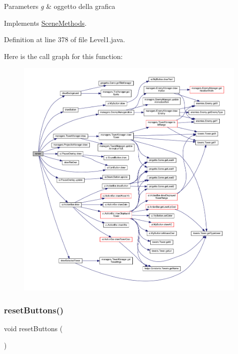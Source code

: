 \begin{DoxyParams}{Parameters}
{\em g} & oggetto della grafica \\
\hline
\end{DoxyParams}


Implements \hyperlink{interfacescenes_1_1_scene_methods_a203b6ad9d5e4d54dd1152986eec4dedc}{Scene\+Methods}.



Definition at line 378 of file Level1.\+java.

Here is the call graph for this function\+:
\nopagebreak
\begin{figure}[H]
\begin{center}
\leavevmode
\includegraphics[width=350pt]{classscenes_1_1_level1_a203b6ad9d5e4d54dd1152986eec4dedc_cgraph}
\end{center}
\end{figure}
\mbox{\label{classscenes_1_1_level1_a548cf4795e9d559d0c0cce0bb57a5251}} 
\subsubsection{\texorpdfstring{reset\+Buttons()}{resetButtons()}}
{\footnotesize\ttfamily void reset\+Buttons (\begin{DoxyParamCaption}{ }\end{DoxyParamCaption})\hspace{0.3cm}{\ttfamily [private]}}



